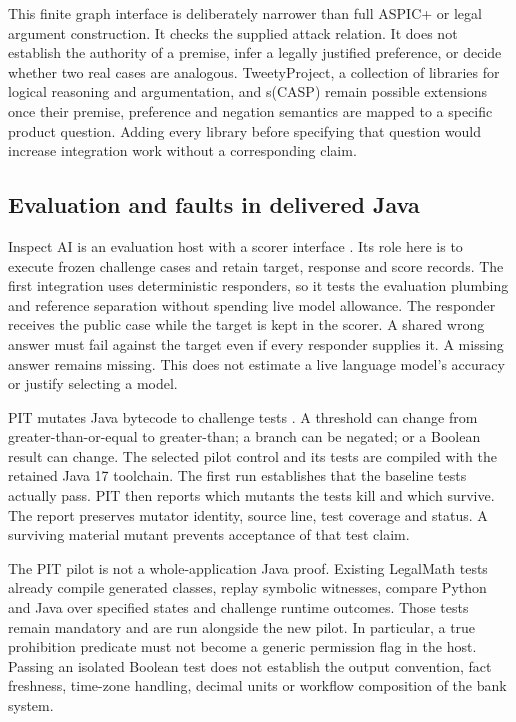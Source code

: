 This finite graph interface is deliberately narrower than full ASPIC+ or legal
argument construction. It checks the supplied attack relation. It does not
establish the authority of a premise, infer a legally justified preference, or
decide whether two real cases are analogous. TweetyProject, a collection of
libraries for logical reasoning and argumentation, and s(CASP) remain
possible extensions once their premise, preference and negation semantics are
mapped to a specific product question. Adding every library before specifying
that question would increase integration work without a corresponding claim.

\subsection{Evaluation and faults in delivered Java}

Inspect AI is an evaluation host with a scorer interface
\citep{inspectsoftware}. Its role here is to execute frozen challenge cases and
retain target, response and score records. The first integration uses deterministic
responders, so it tests the evaluation plumbing and reference separation without
spending live model allowance. The responder receives the public case while the
target is kept in the scorer. A shared wrong answer must fail against the target
even if every responder supplies it. A missing answer remains missing. This
does not estimate a live language model's accuracy or justify selecting a model.

PIT mutates Java bytecode to challenge tests \citep{pitsoftware}. A threshold can
change from greater-than-or-equal to greater-than; a branch can be negated; or a
Boolean result can change. The selected pilot control and its tests are compiled
with the retained Java 17 toolchain. The first run establishes that the baseline
tests actually pass. PIT then reports which mutants the tests kill and which
survive. The report preserves mutator identity, source line, test coverage and
status. A surviving material mutant prevents acceptance of that test claim.

The PIT pilot is not a whole-application Java proof. Existing LegalMath tests
already compile generated classes, replay symbolic witnesses, compare Python
and Java over specified states and challenge runtime outcomes. Those tests remain
mandatory and are run alongside the new pilot. In particular, a true prohibition
predicate must not become a generic permission flag in the host. Passing an
isolated Boolean test does not establish the output convention, fact freshness,
time-zone handling, decimal units or workflow composition of the bank system.


